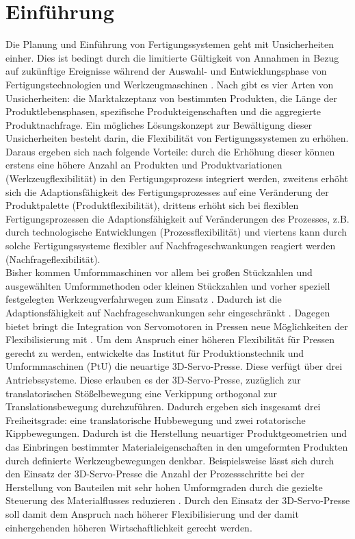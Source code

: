 \chapter{Einführung}

Die Planung und Einführung von Fertigungssystemen geht mit Unsicherheiten einher. Dies ist bedingt durch die limitierte Gültigkeit von Annahmen in Bezug auf zukünftige Ereignisse während der Auswahl- und Entwicklungsphase von Fertigungstechnologien und Werkzeugmaschinen \cite{Groche.2010}. Nach \cite{Gerwin.1993} gibt es vier Arten von Unsicherheiten: die Marktakzeptanz von bestimmten Produkten, die Länge der Produktlebensphasen, spezifische Produkteigenschaften und die aggregierte Produktnachfrage. Ein mögliches Lösungskonzept zur Bewältigung dieser Unsicherheiten besteht darin, die Flexibilität von Fertigungssystemen zu erhöhen. Daraus ergeben sich nach \cite{Son.1987} folgende Vorteile: durch die Erhöhung dieser können erstens eine höhere Anzahl an Produkten und Produktvariationen (Werkzeugflexibilität) in den Fertigungsprozess integriert werden, zweitens erhöht sich die Adaptionsfähigkeit des Fertigungsprozesses auf eine Veränderung der Produktpalette (Produktflexibilität), drittens erhöht sich bei flexiblen Fertigungsprozessen die Adaptionsfähigkeit auf Veränderungen des Prozesses, z.B. durch technologische Entwicklungen (Prozessflexibilität) und viertens kann durch solche Fertigungssysteme flexibler auf Nachfrageschwankungen reagiert werden (Nachfrageflexibilität). \\ 

Bisher kommen Umformmaschinen vor allem bei großen Stückzahlen und ausgewählten Umformmethoden oder kleinen Stückzahlen und vorher speziell festgelegten Werkzeugverfahrwegen zum Einsatz \cite{Groche.2010}. Dadurch ist die Adaptionsfähigkeit auf Nachfrageschwankungen sehr eingeschränkt \cite{Schmoeckel.1991}. Dagegen bietet bringt die Integration von Servomotoren in Pressen neue Möglichkeiten der Flexibilisierung mit \cite{Groche.2004}. Um dem Anspruch einer höheren Flexibilität für Pressen gerecht zu werden, entwickelte das Institut für Produktionstechnik und Umformmaschinen (PtU) die   neuartige 3D-Servo-Presse. Diese verfügt über drei Antriebssysteme. Diese erlauben es der 3D-Servo-Presse, zuzüglich zur translatorischen Stößelbewegung eine Verkippung orthogonal zur Translationsbewegung durchzuführen. Dadurch ergeben sich insgesamt drei Freiheitsgrade: eine translatorische Hubbewegung und zwei rotatorische Kippbewegungen. Dadurch ist die Herstellung neuartiger Produktgeometrien und das Einbringen bestimmter Materialeigenschaften in den umgeformten Produkten durch definierte Werkzeugbewegungen denkbar. Beispielsweise lässt sich durch den Einsatz der 3D-Servo-Presse die Anzahl der Prozessschritte bei der Herstellung von Bauteilen mit sehr hohen Umformgraden durch die gezielte Steuerung des Materialflusses reduzieren \cite{Sinz.2018}. Durch den Einsatz der 3D-Servo-Presse soll damit dem Anspruch nach höherer Flexibilisierung und der damit einhergehenden höheren Wirtschaftlichkeit gerecht werden. \\

